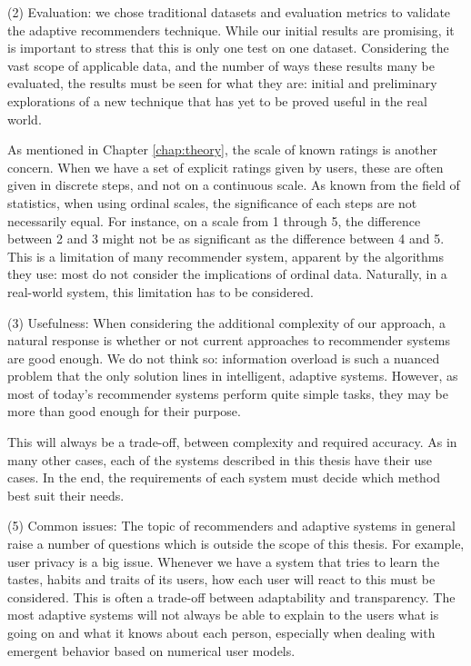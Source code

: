 (2) Evaluation: we chose traditional datasets and evaluation metrics
to validate the adaptive recommenders technique.
While our initial results are promising, it is important to stress
that this is only one test on one dataset. Considering the vast scope
of applicable data, and the number of ways these results many be 
evaluated, the results must be seen for what they are:
initial and preliminary explorations of a new technique
that has yet to be proved useful in the real world.

As mentioned in Chapter \ref{chap:theory}, the scale of known ratings is another concern.
When we have a set of explicit ratings given by users, these are often
given in discrete steps, and not on a continuous scale.
As known from the field of statistics, when using ordinal scales,
the significance of each steps are not necessarily equal.
For instance, on a scale from 1 through 5, the difference
between 2 and 3 might not be as significant as the difference between 4 and 5.
This is a limitation of many recommender system, apparent by the algorithms they use:
most do not consider the implications of ordinal data.
Naturally, in a real-world system, this limitation has to be considered.

(3) Usefulness:
When considering the additional complexity of our approach,
a natural response is whether or not current approaches
to recommender systems are good enough.
We do not think so: information overload is such a nuanced problem 
that the only solution lines in intelligent, adaptive systems.
However, as most of today's recommender systems 
perform quite simple tasks, they may be more
than good enough for their purpose.

This will always be a trade-off, between complexity and required accuracy.
As in many other cases, each of the systems described in this thesis
have their use cases. In the end, the requirements of each system
must decide which method best suit their needs.

(5) Common issues:
The topic of recommenders and adaptive systems in general
raise a number of questions which is outside the scope of this thesis.
For example, user privacy is a big issue.
Whenever we have a system that tries to learn the tastes, habits and
traits of its users, how each user will react to this must be considered.
This is often a trade-off between adaptability and transparency.
The most adaptive systems will not always be able to explain to the users
what is going on and what it knows about each person,
especially when dealing with emergent behavior based on 
numerical user models.

